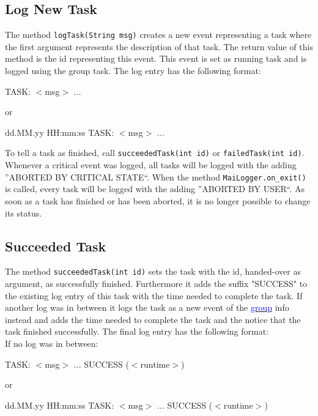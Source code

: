 \documentclass{article}
\newcommand{\refh}[2]{\hyperref[#1] {\textcolor{blue}{#2}}}
\begin{document}
    \subsection{Log New Task}
    \label{tasks_logTask}
    The method \lstinline|logTask(String msg)| creates a new event representing a task where the first argument represents the description of that task.
    The return value of this method is the id representing this event.
    This event is set as running task and is logged using the group task.
    The log entry has the following format:
    \begin{description}
    	\item TASK: $<$msg$>$ ... 
    	\item or
    	\item dd.MM.yy HH:mm:ss TASK: $<$msg$>$ ... 
    \end{description}
    To tell a task as finished, call \lstinline|succeededTask(int id)| or \lstinline|failedTask(int id)|.
    Whenever a critical event was logged, all tasks will be logged with the adding ''ABORTED BY CRITICAL STATE``.
    When the method \lstinline|MaiLogger.on_exit()| is called, every task will be logged with the adding ''ABORTED BY USER``.
    As soon as a task has finished or has been aborted, it is no longer possible to change its status.

    \subsection{Succeeded Task}
    \label{tasks_succeededTask}
    The method \lstinline|succeededTask(int id)| sets the task with the id, handed-over as argument, as successfully finished.
    Furthermore it adds the suffix "SUCCESS" to the existing log entry of this task with the time needed to complete the task.
    If another log was in between it logs the task as a new event of the \refh{logging_groups}{group} info instead and adds the time needed to complete the task and the notice that the task finished successfully.
    The final log entry has the following format: \\
    If no log was in between:
    \begin{description}
        \item TASK: $<$msg$>$ ... SUCCESS ($<$runtime$>$)
        \item or
        \item dd.MM.yy HH:mm:ss TASK: $<$msg$>$ ... SUCCESS ($<$runtime$>$)
    \end{description} ~\\
\end{document}
